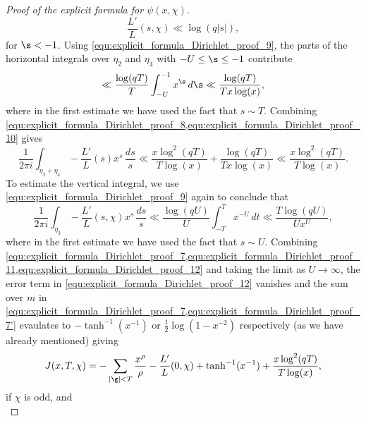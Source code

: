 \begin{proof}[Proof of the explicit formula for $\psi(x,\chi)$]
        \begin{equation}\label{equ:explicit_formula_Dirichlet_proof_9}
          \frac{L'}{L}(s,\chi) \ll \log(q|s|),
        \end{equation}
        for $\s < -1$. Using \cref{equ:explicit_formula_Dirichlet_proof_9}, the parts of the horizontal integrals over $\eta_{2}$ and $\eta_{4}$ with $-U \le \s \le -1$ contribute
        \begin{equation}\label{equ:explicit_formula_Dirichlet_proof_10}
          \ll \frac{\log(qT)}{T}\int_{-U}^{-1}x^{\s}\,d\s \ll \frac{\log(qT)}{Tx\log(x)},
        \end{equation}
        where in the first estimate we have used the fact that $s \sim T$. Combining \cref{equ:explicit_formula_Dirichlet_proof_8,equ:explicit_formula_Dirichlet_proof_10} gives
        \begin{equation}\label{equ:explicit_formula_Dirichlet_proof_11}
          \frac{1}{2\pi i}\int_{\eta_{2}+\eta_{4}}-\frac{L'}{L}(s)x^{s}\,\frac{ds}{s} \ll \frac{x\log^{2}(qT)}{T\log(x)}+\frac{\log(qT)}{Tx\log(x)} \ll \frac{x\log^{2}(qT)}{T\log(x)}.
        \end{equation}
        To estimate the vertical integral, we use \cref{equ:explicit_formula_Dirichlet_proof_9} again to conclude that
        \begin{equation}\label{equ:explicit_formula_Dirichlet_proof_12}
          \frac{1}{2\pi i}\int_{\eta_{3}}-\frac{L'}{L}(s,\chi)x^{s}\,\frac{ds}{s} \ll \frac{\log(qU)}{U}\int_{-T}^{T}x^{-U}\,dt \ll \frac{T\log(qU)}{Ux^{U}},
        \end{equation}
        where in the first estimate we have used the fact that $s \sim U$. Combining \cref{equ:explicit_formula_Dirichlet_proof_7,equ:explicit_formula_Dirichlet_proof_11,equ:explicit_formula_Dirichlet_proof_12} and taking the limit as $U \to \infty$, the error term in \cref{equ:explicit_formula_Dirichlet_proof_12} vanishes and the sum over $m$ in \cref{equ:explicit_formula_Dirichlet_proof_7,equ:explicit_formula_Dirichlet_proof_7'} evaulates to $-\tanh^{-1}(x^{-1})$ or $\frac{1}{2}\log(1-x^{-2})$ respectively (as we have already mentioned) giving
        \begin{equation}\label{equ:explicit_formula_Dirichlet_proof_13}
          J(x,T,\chi) = -\sum_{|\g| < T}\frac{x^{\rho}}{\rho}-\frac{L'}{L}(0,\chi)+\tanh^{-1}(x^{-1})+\frac{x\log^{2}(qT)}{T\log(x)},
        \end{equation}
        if $\chi$ is odd, and
        \begin{equation}\label{equ:explicit_formula_Dirichlet_proof_13'}

\end{equation}
\end{proof}
